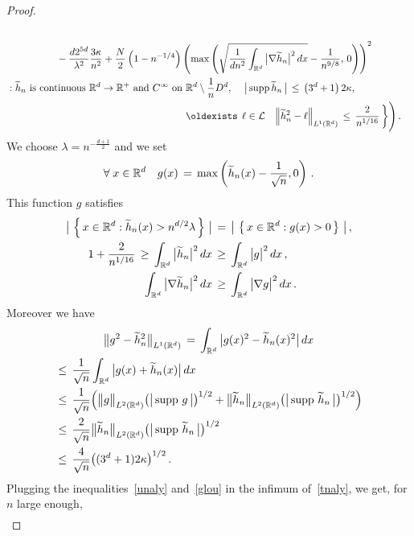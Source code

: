 \documentclass[10pt]{amsart}
\theoremstyle{definition}\newtheorem{defi}[theo]{Definition}\newtheorem{rema}[theo]{Remark}\newtheorem{exam}[theo]{Example}\newtheorem{exem}[theo]{Example}\newtheorem{nota}[theo]{Notation}
\newcommand*\supp{\text{supp\,}}
\newcommand*\Rd {{\mathbb R^d}}
\newcommand*\R{\mathbb{R}}
\newcommand*\hht{\smash{\widetilde h}}
\newcommand{\cL}{\mathcal{L}}
\renewcommand*{\exists}{\mathrel{\oldexists}}
\let\oldforall\forall
\renewcommand*{\forall}{\mathrel{\oldforall}}
\begin{document}
\begin{proof}
\begin{multline}
\begin{aligned}
\\
&\mkern90mu-\frac{d2^{5d}}{\lambda^2}
\frac{3\kappa}{n^2} +
\frac{N} {2} \left(1-n^{-1/4}
\right)
\left(\max\left(\sqrt{
\frac{1}{dn^2}\int_{\Rd}\big|\nabla \hht_n\big|^2\,dx}-
\frac{1}{n^{9/8}},\,0\right) \right)^2
\\
&:\hht_n\text{ is continuous } \Rd\to\R^+
\text{ and }C^\infty\text{ on }\Rd\setminus \frac{1}{n}D^d,\,
\quad
\big|\,\supp\hht_n\,\big|\,\leq\, \left(3^d+1\right)2\kappa,\,
\\
&\mkern320mu \exists\,\ell\in\cL\quad
\Big\|\hht_n^2- \ell\Big\|_{L^1(\Rd)}
\,\leq\,
\frac{2}{n^{1/16}}
\,\bigg\}\Bigg)\,.
\end{aligned}
\end{multline}
We choose $\lambda=n^{-\frac{d+1}{2}}$ and we set
\[
\forall x\in \Rd\quad
g(x)\,=\,\max\left(
\hht_n(x)- \frac{1}{\sqrt{n}},0 \right)\,.
\]
This function $g$ satisfies
\begin{equation}\label{unaly}
\begin{aligned}
\big|\,\left\{\,x\in \Rd:\hht_n(x)>n^{d/2}{\lambda}\,\right\}\,\big| &\,=\,
\big|\,\left\{\,x\in \Rd:g(x)>0\,\right\}\,\big|\,,\\ 1+\frac{2}{n^{1/16}}
\,\geq\,\int_{\Rd}\big|\hht_n\big|^2\,dx &\,\geq\,
\int_{\Rd}\big| g\big|^2\,dx\,,\\
\int_{\Rd}\big|\nabla \hht_n\big|^2\,dx &\,\geq\,
\int_{\Rd}\big|\nabla g\big|^2\,dx\,.
\hfil
\end{aligned}
\end{equation}
Moreover we have
\begin{multline}\label{glou}
\big\|g^2-\hht_n^2\big\|_{L^1(\Rd)}\,=\,
\int_{\Rd}\big| g(x)^2-
\hht_n(x)^2
\big|\,dx\\
\begin{aligned}
&\leq\,\frac{1}{\sqrt{n}}\int_{\Rd}\big| g(x)+\hht_n(x)\big|\,dx\\
&\leq\,
\frac{1}{\sqrt{n}}\Big(
\big\|g\big\|_{L^2(\Rd)}
\big(\big|\,\supp\,g\,\big|\big)^{1/2}+
\big\|\hht_n\big\|_{L^2(\Rd)}
\big(\big|\,\supp\,\hht_n\,\big|\big)^{1/2}\Big)\\
&\leq\,
\frac{2}{\sqrt{n}}
\big\|\hht_n\big\|_{L^2(\Rd)}
\big(\big|\,\supp\,\hht_n\,\big|\big)^{1/2}\\ &\leq\,
\frac{4}{\sqrt{n}}
\big((3^d+1)2\kappa\big)^{1/2}\,.
\end{aligned}
\end{multline}
Plugging the inequalities~\eqref{unaly} and~\eqref{glou} in the infimum of~\eqref{tnaly}, we get, for $n$ large enough,
\begin{multline*}

\end{multline*}
\end{proof}
\end{document}
